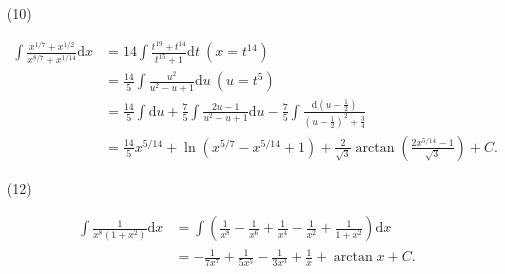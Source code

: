 \begin{enumerate}
    \item[(10)]
    \begin{solution}
        \begin{align*}
            \int \frac{x^{1/7}+x^{1/2}}{x^{8/7}+x^{1/14}} \mathrm dx &= 14 \int \frac{t^{19} + t^{14}}{t^{15} + 1} \mathrm dt \ (x = t^{14}) \\
            &= \frac {14} 5 \int \frac{u^2}{u^2-u+1} \mathrm du \ (u = t^5) \\
            &= \frac {14} 5 \int \mathrm du + \frac 7 5 \int \frac{2u - 1}{u^2-u+1} \mathrm du - \frac 7 5 \int \frac{\mathrm d \left( u - \frac 1 2 \right)}{\left( u-\frac 1 2 \right)^2 + \frac 3 4} \\
            &= \frac {14} 5 x^{5/14} + \ln\left( x^{5/7} - x^{5/14} + 1 \right) + \frac 2 {\sqrt 3} \arctan\left( \frac{2x^{5/14} - 1}{\sqrt 3} \right) + C.
        \end{align*}
    \end{solution}
    \item[(12)]
    \begin{solution}
        \begin{align*}
            \int \frac 1 {x^8(1+x^2)} \mathrm dx &= \int \left( \frac 1 {x^8} - \frac 1 {x^6} + \frac 1 {x^4} - \frac 1 {x^2} + \frac 1 {1+x^2} \right) \mathrm dx \\
            &= - \frac 1 {7x^7} + \frac 1 {5x^5} - \frac 1 {3x^3} + \frac 1 x + \arctan x + C.
        \end{align*}
    \end{solution}
\end{enumerate}


